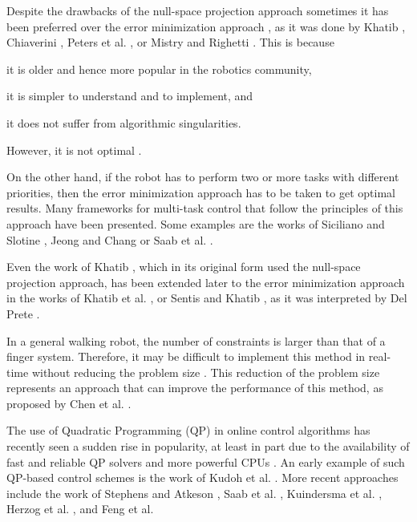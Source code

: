 	Despite the drawbacks of the null-space projection approach sometimes it has been preferred
	over the error minimization approach \cite{DelPrete_PhDThesis2013}, as it was done by
	Khatib	\cite{Khatib_IJRR1995}, Chiaverini \cite{Chiaverini_RoboticsAuto1997},
	Peters et al. \cite{Peters_AutoRobots2008}, or Mistry and Righetti \cite{Mistry_RSS2011}. 
	This is because
	\begin{inparaenum}
		\item it is older and hence more popular in the robotics community,
		\item it is simpler to understand and to implement, and
		\item it does not suffer from algorithmic singularities.
	\end{inparaenum}
	However, it is not optimal \cite{DelPrete_PhDThesis2013}.
		
	On the other hand, if the robot has to perform two or more tasks with different priorities,
	then the error minimization approach has to be taken to get optimal results.
	Many frameworks for multi-task control that follow the principles of this approach have been
	presented.
	Some examples are the works of Siciliano and Slotine \cite{Siciliano_AdvRobotics1991},
	Jeong and Chang \cite{Jeong_IROS2009} or Saab et al. \cite{Saab_ICRA2011}.
	
	Even the work of Khatib	\cite{Khatib_IJRR1995}, which in its original form used the null-space
	projection approach, has been extended later to the error minimization approach in the works
	of Khatib et al. \cite{Khatib_IJHR2004}, or Sentis and Khatib \cite{Sentis_ICRA2006}, as it
	was interpreted by Del Prete \cite{DelPrete_PhDThesis2013}.
		
	In a general walking robot, the number of constraints is larger than that of a finger system.
	Therefore, it may be difficult to implement this method in real-time without reducing the
	problem size \cite{Kwon_IntellRobotSys1998}.
	This reduction of the problem size represents an approach that can improve the performance
	of this method, as proposed by Chen et al. \cite{Chen_MIRC1999}.
	
	The use of Quadratic Programming (QP) in online control algorithms has recently seen a sudden
	rise in popularity,	at least in part due to the availability of fast and reliable QP solvers
	and more powerful CPUs \cite{Koolen_IJHR2016}.
	An early example of such QP-based control schemes is the work of Kudoh et al. \cite{Kudoh_IROS2002}.
	More recent approaches include the work of Stephens and Atkeson \cite{Stephens_IROS2010},
	Saab et al. \cite{Saab_TransRobotics2013}, Kuindersma et al. \cite{Kuindersma_ICRA2014},
	Herzog et al. \cite{Herzog_IROS2014}, and Feng et al. \cite{Feng_Humanoids2014}
	
